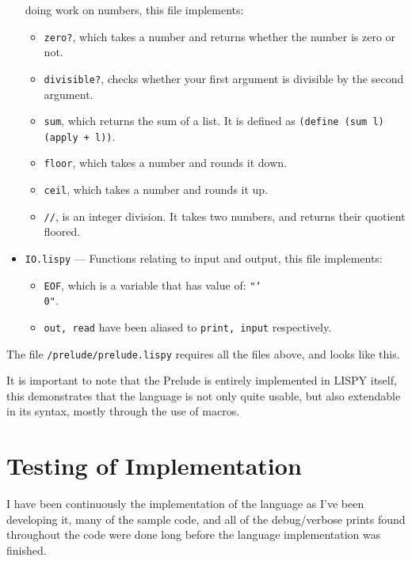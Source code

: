 \documentclass{article}
\newcommand{\code}[1]{\texttt{#1}}
\begin{document}
\begin{itemize}
            doing work on numbers, this file implements:
              \begin{itemize}
                \item \code{zero?}, which takes a number and returns whether the
                number is zero or not.
                \item \code{divisible?}, checks whether your first argument is
                divisible by the second argument.
                \item \code{sum}, which returns the sum of a list. It is
                defined as \code{(define (sum l) (apply + l))}.
                \item \code{floor}, which takes a number and rounds it down.
                \item \code{ceil},  which takes a number and rounds it up.
                \item \code{//}, is an integer division. It takes two numbers,
                  and returns their quotient floored.
              \end{itemize}
      \item \code{IO.lispy} --- Functions relating to input and output, this file implements:
        \begin{itemize}
          \item \code{EOF}, which is a variable that has value of: \code{"\char`\\0"}.
          \item \code{out, read} have been aliased to \code{print, input}
          respectively.
        \end{itemize}
    \end{itemize}

    The file \code{/prelude/prelude.lispy} requires all the files above, and looks
    like this.


    It is important to note that the Prelude is entirely implemented in LISPY
    itself, this demonstrates that the language is not only quite usable, but also
    extendable in its syntax, mostly through the use of macros.

  \clearpage

\section{Testing of Implementation}
  I have been continuously the implementation of the language as I've been
  developing it, many of the sample code, and all of the debug/verbose prints
  found throughout the code were done long before the language implementation
  was finished.
\end{document}
